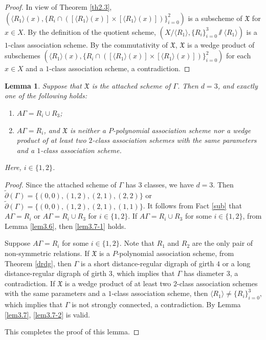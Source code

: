 \documentclass[12pt,a4paper]{amsart}
\newtheorem{lemma}[thm]{Lemma}
\theoremstyle{definition}
\begin{document}
\begin{proof}
In view of Theorem \ref{th2.3}, $(\langle R_1\rangle(x),\{R_i\cap([\langle R_1\rangle(x)]\times [\langle R_1\rangle(x)])\}_{i=0}^2)$ is a subscheme of $\mathfrak{X}$ for $x\in X$. By the definition of the quotient scheme, $(X/\langle R_1\rangle, \{R_i\}_{i=0}^3 \sslash \langle R_1\rangle)$ is a $1$-class association scheme. By the commutativity of $\mathfrak{X}$, $\mathfrak{X}$ is a wedge product of subschemes $(\langle R_1\rangle(x),\{R_i\cap([\langle R_1\rangle(x)]\times [\langle R_1\rangle(x)])\}_{i=0}^2)$ for each $x\in X$ and a $1$-class association scheme, a contradiction.
\end{proof}

\begin{lemma}\label{lem3.8}
Suppose that $\mathfrak{X}$ is the attached scheme of $\Gamma$. Then $d=3$, and exactly one of the following holds:
\begin{enumerate}
\item\label{lem3.7-1} $A\Gamma=R_i\cup R_3$;
	
\item\label{lem3.7-2} $A\Gamma=R_i$, and $\mathfrak{X}$ is neither a $P$-polynomial association scheme nor a wedge product of at least two $2$-class association schemes with the same parameters and a $1$-class association scheme.
\end{enumerate}
Here, $i\in\{1,2\}$.
\end{lemma}
\begin{proof}
Since the attached scheme of $\Gamma$ has $3$ classes, we have $d=3$. Then $\tilde{\partial}(\Gamma)= \{(0,0),(1,2),(2,1),(2,2)\}$ or $\tilde{\partial}(\Gamma)= \{(0,0),(1,2),(2,1),(1,1)\}$. It follows from Fact \ref{sub} that $A\Gamma=R_i$ or $A\Gamma=R_i\cup R_3$ for $i\in\{1,2\}$. If $A\Gamma=R_i\cup R_3$ for some $i\in\{1,2\}$, from Lemma \ref{lem3.6}, then \ref{lem3.7-1} holds.

Suppose $A\Gamma=R_i$ for some $i\in \{1,2\}$. Note that $R_1$ and $R_2$ are the only pair of non-symmetric relations. If $\mathfrak{X}$ is a $P$-polynomial association scheme, from Theorem \ref{drdg}, then $\Gamma$ is a short distance-regular digraph of girth $4$ or a long distance-regular digraph of girth $3$, which implies that $\Gamma$ has diameter $3$, a contradiction. If $\mathfrak{X}$ is a wedge product of at least two $2$-class association schemes with the same parameters and a $1$-class association scheme, then $\langle R_1\rangle\neq \{R_i\}_{i=0}^3$, which implies that $\Gamma$ is not strongly connected, a contradiction. By Lemma \ref{lem3.7}, \ref{lem3.7-2} is valid.

This completes the proof of this lemma.
\end{proof}
\end{document}
